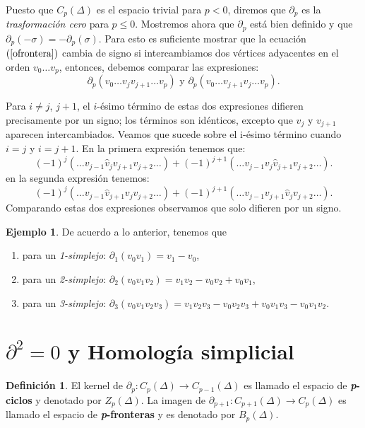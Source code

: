 \documentclass[12pt]{book}
\theoremstyle{definition}
\newtheorem{definition}[theorem]{Definición}
\newtheorem{example}[theorem]{Ejemplo}
\newcounter{in}
\newcounter{ini}
\begin{document}
Puesto que $C_{p}(\Delta)$ es el espacio trivial para $p<0$, diremos
que $\partial_{p}$ es la \textit{trasformación cero} para $p\leq
0$. Mostremos ahora que $\partial_{p}$ está bien definido y que
$\partial_{p}(-\sigma)=-\partial_{p}(\sigma)$. Para esto es suficiente
mostrar que la ecuación $(\ref{ofrontera})$ cambia de signo si intercambiamos dos
vértices adyacentes en el orden $v_{0}\ldots v_{p}$, entonces,
debemos comparar las expresiones:
$$\partial_{p}(v_{0}\ldots v_{j} v_{j+1} \ldots v_{p}) \mbox{ y } \partial_{p}(v_{0}\ldots v_{j+1} v_{j} \ldots v_{p}).$$

Para $i\neq j$, $j+1$, el $i$-ésimo término de estas dos expresiones
difieren precisamente por un signo; los términos son idénticos,
excepto que $v_{j}$ y $v_{j+1}$ aparecen intercambiados. Veamos que
sucede sobre el i-ésimo término cuando $i=j$ y $i=j+1$. En la primera
expresión tenemos que:
$$(-1)^{j}(\ldots v_{j-1} \widehat v_{j}v_{j+1}v_{j+2}\ldots)+(-1)^{j+1}(\ldots v_{j-1}v_{j}\widehat v_{j+1}v_{j+2}\ldots).$$
en la segunda expresión tenemos:
$$(-1)^{j}(\ldots v_{j-1}\widehat v_{j+1}v_{j}v_{j+2}\ldots)+(-1)^{j+1}(\ldots v_{j-1}v_{j+1}\widehat v_{j}v_{j+2}\ldots).$$
Comparando estas dos expresiones observamos que solo difieren por un signo.

\begin{example}
  De acuerdo a lo anterior, tenemos que
  \begin{enumerate}
  \item para un \emph{1-simplejo}: $\partial_{1}(v_{0}v_{1})= v_{1}-v_{0}$,
  \item para un \emph{2-simplejo}: $\partial_{2}(v_{0}v_{1}v_{2})=v_{1}v_{2}-v_{0}v_{2}+v_{0}v_{1}$,
  \item para un \emph{3-simplejo}:
    $\partial_{3}(v_{0}v_{1}v_{2}v_{3})=v_{1}v_{2}v_{3}-v_{0}v_{2}v_{3}+v_{0}v_{1}v_{3}-v_{0}v_{1}v_{2}$. 
  \end{enumerate}
\end{example}

\section{$\partial^{2}=0$ y Homología simplicial}

\begin{definition}
   El kernel de $\partial_{p}:C_{p}(\Delta)\rightarrow
   C_{p-1}(\Delta)$ es llamado el espacio de
   \textbf{\emph{p}-ciclos} y denotado por $Z_{p}(\Delta)$. La imagen
   de $\partial_{p+1}:C_{p+1}(\Delta)\rightarrow C_{p}(\Delta)$ es
   llamado el espacio de \textbf{\emph{p}-fronteras} y es denotado por $B_{p}(\Delta)$.
\end{definition}
\end{document}
